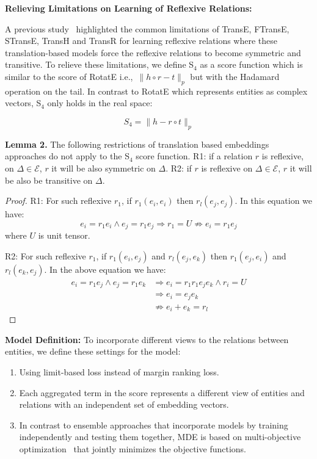\documentclass{ecai}
\begin{document}
\textbf{Relieving Limitations on Learning of Reflexive Relations:}\label{Relieving_Limitation_TransE}

A previous study~\cite{kazemi2018simple} highlighted the common limitations of TransE, FTransE, STransE, TransH and TransR for learning reflexive relations where these translation-based models force the reflexive relations to become symmetric and transitive. To relieve these limitations, we define S$_4$ as a score function which is similar to the score of RotatE i.e.,\ $\parallel h \circ r - t \parallel_p$ but with the Hadamard operation on the tail. In contrast to RotatE which represents entities as complex vectors, S$_4$ only holds in the real space:

\begin{equation}\label{eq:4}
    S_4 = \parallel h - r \circ t\parallel_p
\end{equation} 

\textbf{Lemma 2.} The following restrictions of translation based embeddings approaches do not apply to the S$_4$ score function. 
R1: if a relation $r$ is reflexive, on $\Delta \in \mathcal{E}$, $r$ it will be also symmetric on $\Delta$.
R2: if $r$ is reflexive on $\Delta \in \mathcal{E}$, $r$ it will be also be transitive on $\Delta$.  

\begin{proof}R1: For such reflexive $r_1$, if $r_1(e_i, e_i)$ then $r_l(e_j, e_j)$. 
In this equation we have:
$$e_i = r_1 e_i \wedge e_j = r_1 e_j \Rightarrow r_1 = U \not\Rightarrow e_i = r_1 e_j$$
where $U$ is unit tensor.

R2: For such reflexive $r_1$, if $r_1(e_i, e_j)$ and $r_l(e_j, e_k)$ then $r_1(e_j, e_i)$ and $r_l(e_k, e_j)$. 
In the above equation we have:
\begin{equation*}
\begin{split}
    e_i = r_1 e_j  \wedge e_j = r_1 e_k  & \Rightarrow  e_i = r_1 r_1 e_j e_k \wedge  r_i = U  \\
    & \Rightarrow e_i = e_j e_k \\
    & \not\Rightarrow e_i + e_k = r_l
\end{split}
\end{equation*}
\qedhere
\end{proof}


\textbf{Model Definition:} To incorporate different views to the relations between entities, we define these settings for the model:
\begin{enumerate}
    \item Using limit-based loss instead of margin ranking loss.
    \item Each aggregated term in the score represents a different view of entities and relations with an independent set of embedding vectors.
    \item In contrast to ensemble approaches that incorporate models by training independently and testing them together, MDE is based on multi-objective optimization~\cite{marler2004survey} that jointly minimizes the objective functions. 
\end{enumerate}
\end{document}
